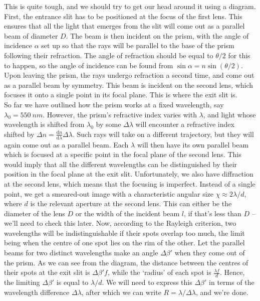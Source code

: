 \documentclass[../TST.tex]{subfiles}
\begin{document}
\ifprob \else
	\begin{solution} This is quite tough, and we should try to get our head around it using a diagram. First, the entrance slit has to be positioned at the focus of the first lens. This ensures that all the light that emerges from the slit will come out as a parallel beam of diameter $D$. The beam is then incident on the prism, with the angle of incidence $\alpha$ set up so that the rays will be parallel to the base of the prism following their refraction. The angle of refraction should be equal to $\theta/2$ for this to happen, so the angle of incidence can be found from  $\sin\alpha= n\sin{(\theta/2)}$. Upon leaving the prism, the rays undergo refraction a second time, and come out as a parallel beam by symmetry. This beam is incident on the second lens, which focuses it onto a single point in its focal plane. This is where the exit slit is.\\[5pt]
		So far we have outlined how the prism works at a fixed wavelength, say $\lambda_0 =\qty{550}{nm}$. However, the prism's refractive index varies with $\lambda$, and light whose wavelength is shifted from $\lambda_0$ by some $\Delta\lambda$ will encounter a refractive index shifted by $\Delta n = \frac{\mathrm{d}n}{\mathrm{d}\lambda}\Delta\lambda$. Such rays will take on a different trajectory, but they will again come out as a parallel beam. Each $\lambda$ will then have its own parallel beam which is focused at a specific point in the focal plane of the second lens. This would imply that all the different wavelengths can be distinguished by their position in the focal plane at the exit slit. Unfortunately, we also have diffraction at the second lens, which means that the focusing is imperfect. Instead of a single point, we get a smeared-out image with a characteristic angular size $\chi\approx 2\lambda/d$, where $d$ is the relevant aperture at the second lens. This can either be the diameter of the lens $D$ or the width of the incident beam $l$, if that's less than $D$ -- we'll need to check this later. Now, according to the Rayleigh criterion, two wavelengths will be indistinguishable if their spots overlap too much, the limit being when the centre of one spot lies on the rim of the other. Let the parallel beams for two distinct wavelengths make an angle $\Delta\beta'$ when they come out of the prism. As we can see from the diagram, the distance between the centres of their spots at the exit slit is $\Delta \beta'f$, while the `radius' of each spot is $\frac{\lambda f}{d}$. Hence, the limiting $\Delta\beta'$ is equal to $\lambda/d$. We will need to express this $\Delta \beta'$ in terms of the wavelength difference $\Delta \lambda$, after which we can write $R=\lambda/\Delta \lambda$, and we're done.\\[5pt]

\end{solution}
\end{document}
